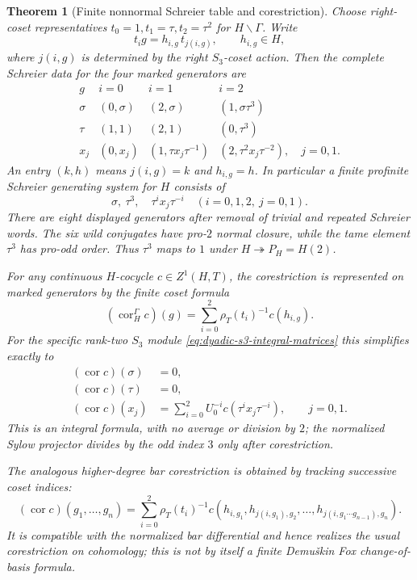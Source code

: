 \documentclass[11pt]{article}
\newtheorem{theorem}{Theorem}[section]
\theoremstyle{definition}
\begin{document}
\begin{theorem}[Finite nonnormal Schreier table and corestriction]
\label{thm:dyadic-s3-schreier-corestriction}
Choose right-coset representatives
$t_0=1,t_1=\tau,t_2=\tau^2$
for $H\backslash\Gamma$.
Write
\[
t_i g=h_{i,g}\,t_{j(i,g)},\qquad
h_{i,g}\in H,
\]
where $j(i,g)$ is determined by the
right $S_3$-coset action.
Then the complete Schreier data
for the four marked generators are
\begin{equation}\label{eq:dyadic-s3-schreier-table}
\boxed{
\begin{array}{c|ccc}
g& i=0&i=1&i=2\\ \hline
\sigma&
(0,\sigma)&(2,\sigma)&(1,\sigma\tau^3)\\
\tau&
(1,1)&(2,1)&(0,\tau^3)\\
x_j&
(0,x_j)&(1,\tau x_j\tau^{-1})&
(2,\tau^2x_j\tau^{-2}),\quad j=0,1 .
\end{array}}
\end{equation}
An entry $(k,h)$ means $j(i,g)=k$
and $h_{i,g}=h$.
In particular a finite profinite
Schreier generating system for $H$
consists of
\[
\sigma,\ \tau^3,\quad
\tau^i x_j\tau^{-i}
\quad(i=0,1,2,\ j=0,1).
\]
There are eight displayed
generators after removal of trivial
and repeated Schreier words.
The six wild conjugates have
pro-$2$ normal closure, while the
tame element $\tau^3$ has pro-odd
order.  Thus $\tau^3$ maps to $1$
under $H\twoheadrightarrow P_H=H(2)$.

For any continuous $H$-cocycle
$c\in Z^1(H,T)$, the corestriction
is represented on marked generators
by the finite coset formula
\begin{equation}\label{eq:dyadic-s3-transfer-one}
(\operatorname{cor}_H^\Gamma c)(g)
=\sum_{i=0}^{2}
  \rho_T(t_i)^{-1}c(h_{i,g}).
\end{equation}
For the specific rank-two $S_3$
module \eqref{eq:dyadic-s3-integral-matrices}
this simplifies \emph{exactly} to
\begin{equation}\label{eq:dyadic-s3-transfer-simplified}
\boxed{
\begin{aligned}
(\operatorname{cor}c)(\sigma)&=0,\\
(\operatorname{cor}c)(\tau)&=0,\\
(\operatorname{cor}c)(x_j)
 &=\sum_{i=0}^{2} U_0^{-i}
   c(\tau^i x_j\tau^{-i}),
 \qquad j=0,1 .
\end{aligned}}
\end{equation}
This is an integral formula, with
no average or division by $2$;
the normalized Sylow projector
divides by the odd index $3$ only
\emph{after} corestriction.

The analogous higher-degree bar
corestriction is obtained by tracking
successive coset indices:
\begin{equation}\label{eq:dyadic-s3-transfer-all-arity}
(\operatorname{cor}c)(g_1,\dots,g_n)
=\sum_{i=0}^2\rho_T(t_i)^{-1}
c\!\left(h_{i,g_1},
h_{j(i,g_1),g_2},\ldots,
h_{j(i,g_1\cdots g_{n-1}),g_n}\right).
\end{equation}
It is compatible with the normalized
bar differential and hence realizes
the usual corestriction on
cohomology; this is \emph{not}
by itself a finite Demu\v{s}kin
Fox change-of-basis formula.
\end{theorem}
\end{document}
